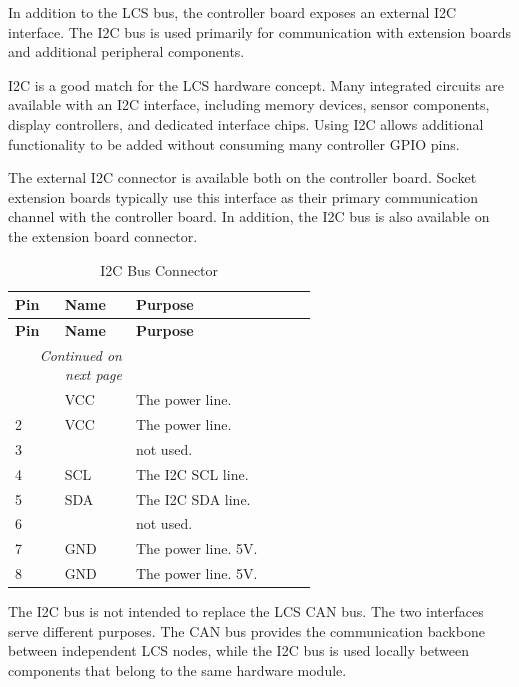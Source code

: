 In addition to the LCS bus, the controller board exposes an external I2C interface. The I2C bus is 
used primarily for communication with extension boards and additional peripheral components.

I2C is a good match for the LCS hardware concept. Many integrated circuits are available with an 
I2C interface, including memory devices, sensor components, display controllers, and dedicated 
interface chips. Using I2C allows additional functionality to be added without consuming many 
controller GPIO pins.

The external I2C connector is available both on the controller board. 
Socket extension boards typically use this interface as their primary communication channel with the 
controller board.
In addition, the I2C bus is also available on the extension board connector.

\begin{longtable}{@{}|l|l|p{0.6\linewidth}|@{}}
    \caption{I2C Bus Connector} \\
    \toprule
    \textbf{Pin} & \textbf{Name} & \textbf{Purpose} \\
    \midrule
    \endfirsthead
    \toprule
    \textbf{Pin} & \textbf{Name} & \textbf{Purpose} \\
    \midrule
    \endhead
    \midrule
    \multicolumn{2}{r}{\textit{Continued on next page}} \\
    \midrule
    \endfoot
    \bottomrule
    \endlastfoot
    1 & VCC & The power line. \\
    \midrule
    2 & VCC & The power line. \\
    \midrule
    3 &  & not used. \\
    \midrule
    4 & SCL & The I2C SCL line. \\
    \midrule
    5 & SDA & The I2C SDA line. \\
    \midrule
    6 &  & not used. \\
    \midrule
    7 & GND & The power line. 5V. \\
    \midrule
    8 & GND & The power line. 5V. \\  
\end{longtable}
\FloatBarrier

The I2C bus is not intended to replace the LCS CAN bus. The two interfaces serve different purposes. 
The CAN bus provides the communication backbone between independent LCS nodes, while the I2C bus is 
used locally between components that belong to the same hardware module.

